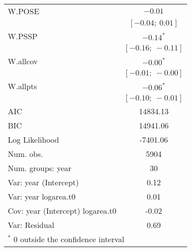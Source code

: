 \begin{table}
\begin{center}
\begin{tabular}{l c }
W.POSE                           & $-0.01$           \\
                                 & $[-0.04;\ 0.01]$  \\
W.PSSP                           & $-0.14^{*}$       \\
                                 & $[-0.16;\ -0.11]$ \\
W.allcov                         & $-0.00^{*}$       \\
                                 & $[-0.01;\ -0.00]$ \\
W.allpts                         & $-0.06^{*}$       \\
                                 & $[-0.10;\ -0.01]$ \\
\hline
AIC                              & 14834.13          \\
BIC                              & 14941.06          \\
Log Likelihood                   & -7401.06          \\
Num. obs.                        & 5904              \\
Num. groups: year                & 30                \\
Var: year (Intercept)            & 0.12              \\
Var: year logarea.t0             & 0.01              \\
Cov: year (Intercept) logarea.t0 & -0.02             \\
Var: Residual                    & 0.69              \\
\hline
\multicolumn{2}{l}{\scriptsize{$^*$ 0 outside the confidence interval}}
\end{tabular}
\label{table:PSSPgrowth-byYr}
\end{center}
\end{table}


